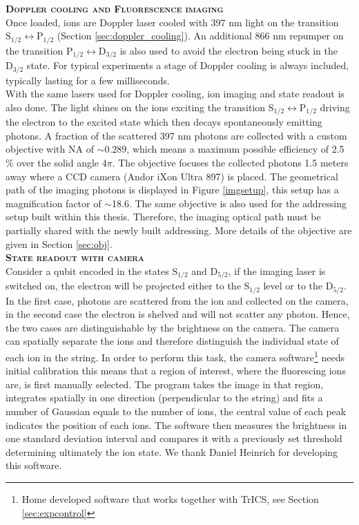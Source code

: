 \textbf{\textsc{Doppler cooling and Fluorescence imaging}}\\
Once loaded, ions are Doppler laser cooled with 397 nm light on the transition $\text{S}_{1/2} \leftrightarrow \text{P}_{1/2}$ (Section \ref{sec:doppler_cooling}). An additional 866 nm repumper on the transition $\text{P}_{1/2} \leftrightarrow \text{D}_{3/2}$ is also used to avoid the electron being stuck in the $\text{D}_{3/2}$ state. For typical experiments a stage of Doppler cooling is always included, typically lasting for a few milliseconds.\\
With the same lasers used for Doppler cooling, ion imaging and state readout is also done. The light shines on the ions exciting the transition $\text{S}_{1/2} \leftrightarrow \text{P}_{1/2}$ driving the electron to the excited state which then decays spontaneously emitting photons. A fraction of the scattered 397 nm photons are collected with a custom objective with NA of $\sim 0.289$, which means a maximum possible efficiency of 2.5 \% over the solid angle $4\pi$. The objective focuses the collected photons 1.5 meters away where a CCD camera (Andor iXon Ultra 897) is placed. The geometrical path of the imaging photons is displayed in Figure \ref{imgsetup}, this setup has a magnification factor of $\sim$18.6. The same objective is also used for the addressing setup built within this thesis. Therefore, the imaging optical path must be partially shared with the newly built addressing. More details of the objective are given in Section \ref{sec:obj}.\vspace{.5em}\\
\textbf{\textsc{State readout with camera}}\\
Consider a qubit encoded in the states $\text{S}_{1/2}$ and $\text{D}_{5/2}$, if the imaging laser is switched on, the electron will be projected either to the $\text{S}_{1/2}$ level or to the $\text{D}_{5/2} $. In the first case, photons are scattered from the ion and collected on the camera, in the second case the electron is shelved and will not scatter any photon. Hence, the two cases are distinguishable by the brightness on the camera. The camera can spatially separate the ions and therefore distinguish the individual state of each ion in the string. In order to perform this task, the camera software\footnote{Home developed software that works together with TrICS, see Section \ref{sec:expcontrol}} needs initial calibration this means that a region of interest, where the fluorescing ions are, is first manually selected. The program takes the image in that region, integrates spatially in one direction (perpendicular to the string) and fits a number of Gaussian equals to the number of ions, the central value of each peak indicates the position of each ions. The software then measures the brightness in one standard deviation interval and compares it with a previously set threshold determining ultimately the ion state. We thank Daniel Heinrich for developing this software.

